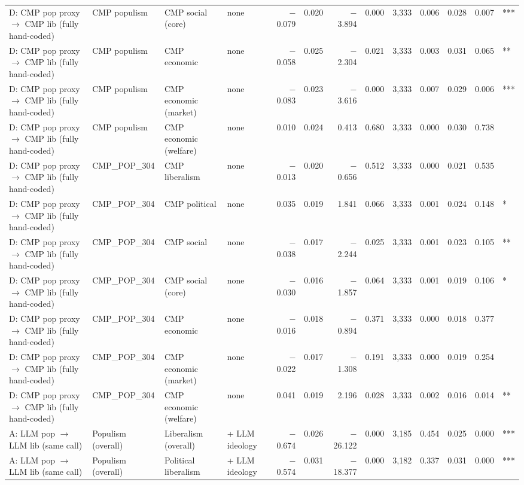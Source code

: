 \begin{table}[ht]
{\begin{tabular}{llllrrrrrrrrl}
D: CMP pop proxy $\rightarrow$ CMP lib (fully hand-coded) & CMP populism & CMP social (core) & none & $-$0.079 & 0.020 & $-$3.894 & 0.000 & 3,333 & 0.006 & 0.028 & 0.007 & *** \\
D: CMP pop proxy $\rightarrow$ CMP lib (fully hand-coded) & CMP populism & CMP economic & none & $-$0.058 & 0.025 & $-$2.304 & 0.021 & 3,333 & 0.003 & 0.031 & 0.065 & ** \\
D: CMP pop proxy $\rightarrow$ CMP lib (fully hand-coded) & CMP populism & CMP economic (market) & none & $-$0.083 & 0.023 & $-$3.616 & 0.000 & 3,333 & 0.007 & 0.029 & 0.006 & *** \\
D: CMP pop proxy $\rightarrow$ CMP lib (fully hand-coded) & CMP populism & CMP economic (welfare) & none & 0.010 & 0.024 & 0.413 & 0.680 & 3,333 & 0.000 & 0.030 & 0.738 &  \\
D: CMP pop proxy $\rightarrow$ CMP lib (fully hand-coded) & CMP\_POP\_304 & CMP liberalism & none & $-$0.013 & 0.020 & $-$0.656 & 0.512 & 3,333 & 0.000 & 0.021 & 0.535 &  \\
D: CMP pop proxy $\rightarrow$ CMP lib (fully hand-coded) & CMP\_POP\_304 & CMP political & none & 0.035 & 0.019 & 1.841 & 0.066 & 3,333 & 0.001 & 0.024 & 0.148 & * \\
D: CMP pop proxy $\rightarrow$ CMP lib (fully hand-coded) & CMP\_POP\_304 & CMP social & none & $-$0.038 & 0.017 & $-$2.244 & 0.025 & 3,333 & 0.001 & 0.023 & 0.105 & ** \\
D: CMP pop proxy $\rightarrow$ CMP lib (fully hand-coded) & CMP\_POP\_304 & CMP social (core) & none & $-$0.030 & 0.016 & $-$1.857 & 0.064 & 3,333 & 0.001 & 0.019 & 0.106 & * \\
D: CMP pop proxy $\rightarrow$ CMP lib (fully hand-coded) & CMP\_POP\_304 & CMP economic & none & $-$0.016 & 0.018 & $-$0.894 & 0.371 & 3,333 & 0.000 & 0.018 & 0.377 &  \\
D: CMP pop proxy $\rightarrow$ CMP lib (fully hand-coded) & CMP\_POP\_304 & CMP economic (market) & none & $-$0.022 & 0.017 & $-$1.308 & 0.191 & 3,333 & 0.000 & 0.019 & 0.254 &  \\
D: CMP pop proxy $\rightarrow$ CMP lib (fully hand-coded) & CMP\_POP\_304 & CMP economic (welfare) & none & 0.041 & 0.019 & 2.196 & 0.028 & 3,333 & 0.002 & 0.016 & 0.014 & ** \\
A: LLM pop $\rightarrow$ LLM lib (same call) & Populism (overall) & Liberalism (overall) & + LLM ideology & $-$0.674 & 0.026 & $-$26.122 & 0.000 & 3,185 & 0.454 & 0.025 & 0.000 & *** \\
A: LLM pop $\rightarrow$ LLM lib (same call) & Populism (overall) & Political liberalism & + LLM ideology & $-$0.574 & 0.031 & $-$18.377 & 0.000 & 3,182 & 0.337 & 0.031 & 0.000 & *** \\

\end{tabular}}
\end{table}
